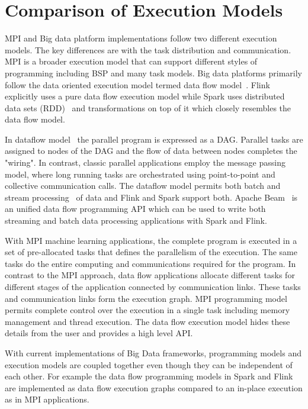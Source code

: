 \documentclass[10pt, conference, compsocconf]{IEEEtran}
\begin{document}
\section{Comparison of Execution Models} \label{sec:exec_models}
MPI and Big data platform implementations follow two different execution models. The key differences are with the task distribution and communication. MPI is a broader execution model that can support different styles of programming including BSP and many task models. Big data platforms primarily follow the data oriented execution model termed data flow model~\cite{akidau2015dataflow}. Flink~\cite{apache_flink} explicitly uses a pure data flow execution model while Spark uses distributed data sets (RDD)~\cite{zaharia2012resilient} and transformations on top of it which closely resembles the data flow model.  

In dataflow model~\cite{akidau2015dataflow} the parallel program is expressed as a \ac{DAG}. Parallel tasks are assigned to nodes of the \ac{DAG} and the flow of data between nodes completes the "wiring". In contrast, classic parallel applications employ the message passing model, where long running tasks are orchestrated using point-to-point and collective communication calls. The dataflow model permits both batch and stream processing~\cite{zaharia2012discretized} of data and Flink and Spark support both. Apache Beam~\cite{apache_beam} is an unified data flow programming API which can be used to write both streaming and batch data processing applications with Spark and Flink. 

With MPI machine learning applications, the complete program is executed in a set of pre-allocated tasks that defines the parallelism of the execution. The same tasks do the entire computing and communications required for the program. In contrast to the MPI approach, data flow applications allocate different tasks for different stages of the application connected by communication links. These tasks and communication links form the execution graph. MPI  programming model permits complete control over the execution in a single task including memory management and thread execution. The data flow execution model hides these details from the user and provides a high level API. 

With current implementations of Big Data frameworks, programming models and execution models are coupled together even though they can be independent of each other. For example the data flow programming models in Spark and Flink are implemented as data flow execution graphs compared to an in-place execution as in MPI applications.
\end{document}

